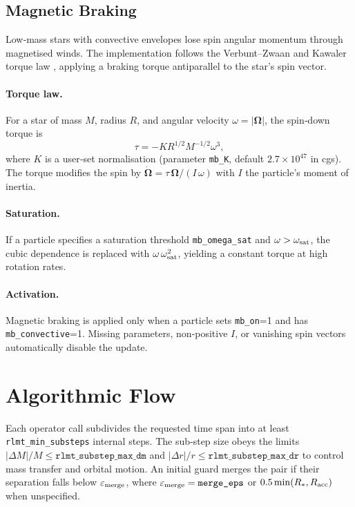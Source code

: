 \documentclass[11pt]{article}
\begin{document}
\subsection{Magnetic Braking}
\label{sec:mb}

Low‑mass stars with convective envelopes lose spin angular momentum through
magnetised winds.  The implementation follows the Verbunt–Zwaan and Kawaler
torque law \citep{Verbunt1981,Kawaler1988}, applying a braking torque
antiparallel to the star's spin vector.

\paragraph{Torque law.} For a star of mass $M$, radius $R$, and angular
velocity $\omega = |\bm\Omega|$, the spin‑down torque is
\begin{equation}
\tau = -K R^{1/2} M^{-1/2} \omega^3,
\label{eq:mb_torque}
\end{equation}
where $K$ is a user‑set normalisation (parameter \texttt{mb\_K}, default
$2.7\times10^{47}$ in cgs).  The torque modifies the spin by
$\dot{\bm\Omega}=\tau\,\bm\Omega/(I\,\omega)$ with $I$ the particle's moment
of inertia.

\paragraph{Saturation.} If a particle specifies a saturation threshold
\texttt{mb\_omega\_sat} and $\omega>\omega_{\rm sat}$, the cubic dependence is
replaced with $\omega\,\omega_{\rm sat}^2$, yielding a constant torque at high
rotation rates.

\paragraph{Activation.} Magnetic braking is applied only when a particle sets
\texttt{mb\_on}=1 and has \texttt{mb\_convective}=1.  Missing parameters,
non‑positive $I$, or vanishing spin vectors automatically disable the update.

\section{Algorithmic Flow}

Each operator call subdivides the requested time span into at least
\texttt{rlmt\_min\_substeps} internal steps.  The sub‑step size obeys the
limits $|\Delta M|/M\le\texttt{rlmt\_substep\_max\_dm}$ and
$|\Delta r|/r\le\texttt{rlmt\_substep\_max\_dr}$ to control mass transfer and
orbital motion.  An initial guard merges the pair if their separation falls
below $\varepsilon_{\rm merge}$, where
$\varepsilon_{\rm merge}=\texttt{merge\_eps}$ or
$0.5\min(R_{*},R_{\rm acc})$ when unspecified.
\end{document}
